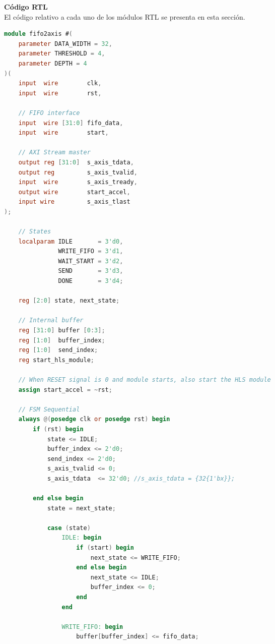 \begin{adjustwidth}{1.5cm}{}
\textbf{Código RTL} \vspace{0.25cm} \\
El código relativo a cada uno de los módulos RTL se presenta en esta sección.

\begin{lstlisting}[language=verilog,frame=single,caption={Código fuente de la cola FIFO conversora a AXI-Stream},showstringspaces=false,label=lst:verilogFifo2axis]
module fifo2axis #(
    parameter DATA_WIDTH = 32,
    parameter THRESHOLD = 4,
    parameter DEPTH = 4
)(
    input  wire        clk,
    input  wire        rst,

    // FIFO interface
    input  wire [31:0] fifo_data,
    input  wire        start,

    // AXI Stream master
    output reg [31:0]  s_axis_tdata,
    output reg         s_axis_tvalid,
    input  wire        s_axis_tready,
    output wire        start_accel,
    input wire         s_axis_tlast
);

    // States
    localparam IDLE       = 3'd0,
               WRITE_FIFO = 3'd1,
               WAIT_START = 3'd2,
               SEND       = 3'd3,
               DONE       = 3'd4;

    reg [2:0] state, next_state;

    // Internal buffer
    reg [31:0] buffer [0:3];
    reg [1:0]  buffer_index;
    reg [1:0]  send_index;
    reg start_hls_module;
    
    // When RESET signal is 0 and module starts, also start the HLS module
    assign start_accel = ~rst; 

    // FSM Sequential
    always @(posedge clk or posedge rst) begin
        if (rst) begin
            state <= IDLE;
            buffer_index <= 2'd0;
            send_index <= 2'd0;
            s_axis_tvalid <= 0;
            s_axis_tdata  <= 32'd0; //s_axis_tdata = {32{1'bx}};
            
        end else begin
            state = next_state;
            
            case (state)
                IDLE: begin
                    if (start) begin
                        next_state <= WRITE_FIFO;
                    end else begin
                    	next_state <= IDLE;
                        buffer_index <= 0;
                    end
                end
               
                WRITE_FIFO: begin
                    buffer[buffer_index] <= fifo_data;
                    

\end{lstlisting}
\end{adjustwidth}
